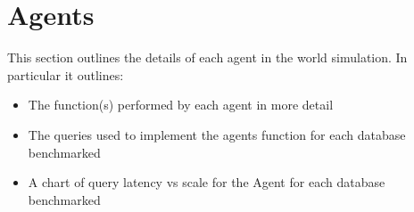 \section{Agents}
This section outlines the details of each agent in the world simulation.
In particular it outlines:

\begin{itemize}
  \item The function(s) performed by each agent in more detail
  \item The queries used to implement the agents function for each database benchmarked
  \item A chart of query latency vs scale for the Agent for each database benchmarked
\end{itemize}
\pagebreak